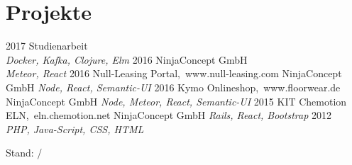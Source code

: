 \documentclass[]{friggeri-cv}
\newcommand{\monthandyear}{\the\month/\the\year}
\begin{document}
\section{Projekte}

\begin{entrylist}
  \entry
    {2017}
    {}
    {Studienarbeit}
    {\\\emph{Docker, Kafka, Clojure, Elm}}
  \entry
    {2016}
    {}
    {NinjaConcept GmbH}
    {\\\emph{Meteor, React}}
  \entry
    {2016}
    {Null-Leasing Portal{\normalfont ,~www.null-leasing.com}}
    {NinjaConcept GmbH}
    {\emph{Node, React, Semantic-UI}}
  \entry
    {2016}
    {Kymo Onlineshop{\normalfont ,~www.floorwear.de}}
    {NinjaConcept GmbH}
    {\emph{Node, Meteor, React, Semantic-UI}}
  \entry
    {2015}
    {KIT Chemotion ELN{\normalfont ,~eln.chemotion.net}}
    {NinjaConcept GmbH}
    {\emph{Rails, React, Bootstrap}}
  \entry
    {2012}
    {}
    {}
    {\\\emph{PHP, Java-Script, CSS, HTML}}
\end{entrylist}

\vfill
\begin{flushright}
{\footnotesize{} Stand: \monthandyear{}}
\end{flushright}
%

% 
\end{document}

